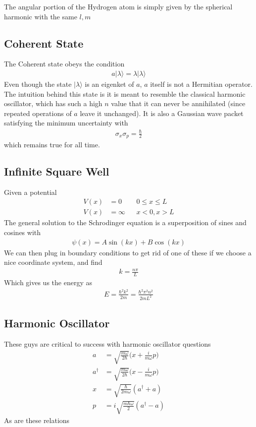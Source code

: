 The angular portion of the Hydrogen atom is simply given by the spherical harmonic with the same $l,m$

\subsection{Coherent State}
The Coherent state obeys the condition
\begin{align}
a|\lambda\rangle = \lambda |\lambda\rangle
\end{align}
Even though the state $|\lambda\rangle$ is an eigenket of $a$, $a$ itself is not a Hermitian operator. The intuition behind this state is it is meant to resemble the classical harmonic oscillator, which has such a high $n$ value that it can never be annihilated (since repeated operations of $a$ leave it unchanged). It is also a Gaussian wave packet satisfying the minimum uncertainty with
\begin{align}
\sigma_x\sigma_p = \frac{\hbar}{2}
\end{align}
which remains true for all time. 


\subsection{Infinite Square Well}
Given a potential
\begin{align}
V(x) &= 0 && 0 \le x\le L\\
V(x) &= \infty && x< 0, x>L
\end{align}
The general solution to the Schrodinger equation is a superposition of sines and cosines with
\begin{align}
\psi(x) = A\sin(kx) + B\cos(kx)
\end{align}
We can then plug in boundary conditions to get rid of one of these if we choose a nice coordinate system, and find 
\begin{align}
k = \frac{n\pi}{L}
\end{align}
Which gives us the energy as
\begin{align}
E = \frac{\hbar^2k^2}{2m} = \frac{\hbar^2\pi^2n^2}{2mL^2}
\end{align}

\subsection{Harmonic Oscillator}
These guys are critical to success with harmonic oscillator questions
\begin{align}
a &= \sqrt{\frac{m\omega}{2\hbar}}\Big(x + \frac{i}{m\omega}p\Big)\\
a^\dagger &= \sqrt{\frac{m\omega}{2\hbar}}\Big(x - \frac{i}{m\omega}p\Big) \\
x &= \sqrt{\frac{\hbar}{2m\omega}}(a^\dagger+a)\\
p &= i\sqrt{\frac{m\hbar\omega}{2}}(a^\dagger - a)
\end{align}
As are these relations

